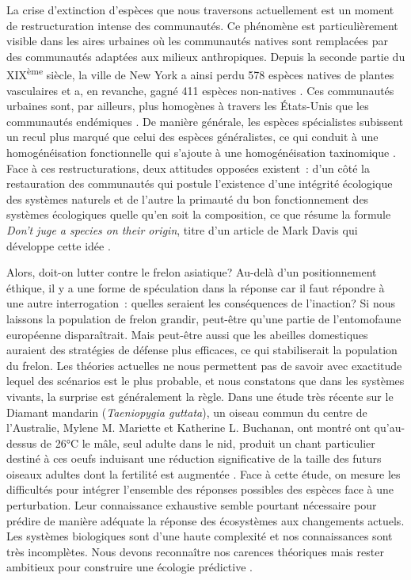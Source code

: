 La crise d'extinction d'espèces que nous traversons actuellement
\citep{Thomas2004} est un moment de restructuration intense des
communautés. Ce phénomène est particulièrement visible dans les aires
urbaines où les communautés natives sont remplacées par des communautés
adaptées aux milieux anthropiques. Depuis la seconde partie du
XIX\textsuperscript{ème} siècle, la ville de New York a ainsi perdu 578
espèces natives de plantes vasculaires et a, en revanche, gagné 411
espèces non-natives \citep{DeCandido2004}. Ces communautés urbaines
sont, par ailleurs, plus homogènes à travers les États-Unis que les
communautés endémiques \citep{McKinney2006}. De manière générale, les
espèces spécialistes subissent un recul plus marqué que celui des
espèces généralistes, ce qui conduit à une homogénéisation fonctionnelle
qui s'ajoute à une homogénéisation taxinomique \citep{Clavel2011}. Face
à ces restructurations, deux attitudes opposées existent~: d'un côté la
restauration des communautés qui postule l'existence d'une intégrité
écologique des systèmes naturels \citep{Suding2015} et de l'autre la
primauté du bon fonctionnement des systèmes écologiques quelle qu'en
soit la composition, ce que résume la formule \emph{Don't juge a species
on their origin}, titre d'un article de Mark Davis qui développe cette
idée \citep{Davis2011}.

Alors, doit-on lutter contre le frelon asiatique? Au-delà d'un
positionnement éthique, il y a une forme de spéculation dans la réponse
car il faut répondre à une autre interrogation~: quelles seraient les
conséquences de l'inaction? Si nous laissons la population de frelon
grandir, peut-être qu'une partie de l'entomofaune européenne
disparaîtrait. Mais peut-être aussi que les abeilles domestiques
auraient des stratégies de défense plus efficaces, ce qui stabiliserait
la population du frelon. Les théories actuelles ne nous permettent pas
de savoir avec exactitude lequel des scénarios est le plus probable, et
nous constatons que dans les systèmes vivants, la surprise est
généralement la règle. Dans une étude très récente sur le Diamant
mandarin (\emph{Taeniopygia guttata}), un oiseau commun du centre de
l'Australie, Mylene M. Mariette et Katherine L. Buchanan, ont montré ont
qu'au-dessus de 26°C le mâle, seul adulte dans le nid, produit un chant
particulier destiné à ces oeufs induisant une réduction significative de
la taille des futurs oiseaux adultes dont la fertilité est augmentée
\citep{Mariette2016}. Face à cette étude, on mesure les difficultés pour
intégrer l'ensemble des réponses possibles des espèces face à une
perturbation. Leur connaissance exhaustive semble pourtant nécessaire
pour prédire de manière adéquate la réponse des écosystèmes aux
changements actuels. Les systèmes biologiques sont d'une haute
complexité et nos connaissances sont très incomplètes. Nous devons
reconnaître nos carences théoriques mais rester ambitieux pour
construire une écologie prédictive \citep{Mouquet2015}.

